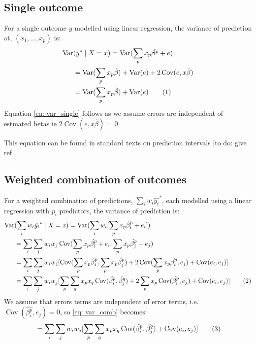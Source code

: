 \documentclass[12pt]{article}
\newcommand{\numberthis}{\addtocounter{equation}{1}\tag{\theequation}}
\newcommand{\Var}{\operatorname{Var}}
\newcommand{\Cov}{\operatorname{Cov}}
\begin{document}
\subsection{Single outcome} %
\label{sub:single_outcome}

 For a single outcome \(y\) modelled using linear regression, the variance of prediction at, \((x_1, ..., x_p)\) is:
\begin{align*}
     \Var&(\hat{y}^* \mid X=x) = \Var(\sum_p x_p\hat{\beta^p} + e)  \\
                                  &= \Var(\sum_p x_p\hat{\beta}) + \Var(e) + 2\Cov(e, x\hat{\beta}) \\
                                  &= \Var(\sum_p x_p\hat{\beta}) + \Var(e) \numberthis \label{eq: var_single} 
\end{align*} 
Equation \ref{eq: var_single} follows as we assume errors are independent of estmated betas ie \(2\Cov(e, x\hat{\beta})\)  = 0.

This equation can be found in standard texts on prediction intervals [to do: give ref].



\subsection{Weighted combination of outcomes} %
\label{sub:Weighted_combination_of_outcomes}

For a weighted combination of predictions, \(\sum_i w_i \hat{y_i}^*\), each modelled using a linear regression with \(p_i\) predictors, the variance of prediction is:
\begin{align*}
    \Var &(\sum_i w_i \hat{y_i}^*\mid X=x) = \Var(\sum_i w_i [\sum_p x_p\hat{\beta_i^p} + e_i]) \\
        &= \sum_i \sum_j w_i w_j \Cov(\sum_p x_p \hat{\beta_i^p} + e_i, \sum_p x_p \hat{\beta_j^p} + e_j) \\
        &= \sum_i \sum_j w_i w_j [\Cov(\sum_p x_p \hat{\beta_i^p}, \sum_p x_p \hat{\beta_j^p}) + 2\Cov(\sum_p x_p \hat{\beta_i^p}, e_j) + \Cov(e_i, e_j)] \\
        &= \sum_i \sum_j w_i w_j [\sum_p \sum_q x_p x_q \Cov(\hat{\beta_i^p},  \hat{\beta_j^q}) + 2 \sum_p x_p \Cov( \hat{\beta_i^p}, e_j) + \Cov(e_i, e_j)] \numberthis \label{eq: var_comb} 
\end{align*}
We assume that errors terms are independent of error terms, i.e. \( \Cov( \hat{\beta_i^p}, e_j) = 0\), so \ref{eq: var_comb} becomes:
\begin{align*}
    & = \sum_i \sum_j w_i w_j [\sum_p \sum_q x_p x_q \Cov(\hat{\beta_i^p},  \hat{\beta_j^q}) + \Cov(e_i, e_j)] \numberthis \label{eq: var_comb_simp}  \\
\end{align*}
\end{document}
